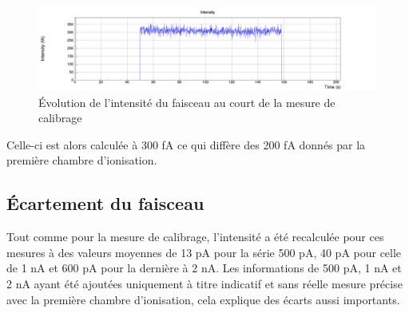 \documentclass[a4paper,11pt]{article}
\begin{document}
\begin{figure}[h]
\begin{center}
\includegraphics[width=1.\linewidth]{Intensity_calib.png} 
\caption{\label{fig:intcalib}\footnotesize{\'Evolution de l'intensité du faisceau au court de la mesure de calibrage}}
\end{center}
\end{figure}

Celle-ci est alors calculée à 300 fA ce qui diffère des 200 fA donnés par la première chambre d'ionisation. 

\subsection*{\'Ecartement du faisceau}
Tout comme pour la mesure de calibrage, l'intensité a été recalculée pour ces mesures à des valeurs moyennes de 13 pA pour la série 500 pA, 40 pA pour celle de 1 nA et 600 pA pour la dernière à 2 nA.
Les informations de 500 pA, 1 nA et 2 nA ayant été ajoutées uniquement à titre indicatif et sans réelle mesure précise avec la première chambre d'ionisation, cela explique des écarts aussi importants.
\end{document}
